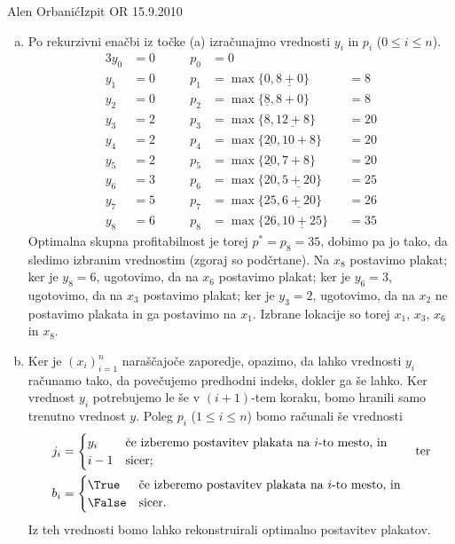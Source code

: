 \begin{naloga}{Alen Orbanić}{Izpit OR 15.9.2010}
\begin{odgovor}
\begin{enumerate}[(a)]
\item Po rekurzivni enačbi iz točke (a)
izračunajmo vrednosti $y_i$ in $p_i$ ($0 \le i \le n$).
\begin{alignat*}{3}
y_0 &= 0 &\qquad p_0 &= 0 \\
y_1 &= 0 &\qquad p_1 &= \max\{0, \underline{8 + 0}\}    &&= 8 \\
y_2 &= 0 &\qquad p_2 &= \max\{\underline{8}, 8 + 0\}    &&= 8 \\
y_3 &= 2 &\qquad p_3 &= \max\{8, \underline{12 + 8}\}   &&= 20 \\
y_4 &= 2 &\qquad p_4 &= \max\{\underline{20}, 10 + 8\}  &&= 20 \\
y_5 &= 2 &\qquad p_5 &= \max\{\underline{20}, 7 + 8\}   &&= 20 \\
y_6 &= 3 &\qquad p_6 &= \max\{20, \underline{5 + 20}\}  &&= 25 \\
y_7 &= 5 &\qquad p_7 &= \max\{25, \underline{6 + 20}\}  &&= 26 \\
y_8 &= 6 &\qquad p_8 &= \max\{26, \underline{10 + 25}\} &&= 35
\end{alignat*}
Optimalna skupna profitabilnost je torej $p^* = p_8 = 35$,
dobimo pa jo tako, da sledimo izbranim vrednostim (zgoraj so podčrtane).
Na $x_8$ postavimo plakat;
ker je $y_8 = 6$, ugotovimo, da na $x_6$ postavimo plakat;
ker je $y_6 = 3$, ugotovimo, da na $x_3$ postavimo plakat;
ker je $y_3 = 2$, ugotovimo,
da na $x_2$ ne postavimo plakata in ga postavimo na $x_1$.
Izbrane lokacije so torej $x_1$, $x_3$, $x_6$ in $x_8$.

\item Ker je $(x_i)_{i=1}^n$ naraščajoče zaporedje,
opazimo, da lahko vrednosti $y_i$ računamo tako,
da povečujemo predhodni indeks, dokler ga še lahko.
Ker vred\-nost $y_i$ potrebujemo le še v $(i+1)$-tem koraku,
bomo hranili samo trenutno vrednost $y$.
Poleg $p_i$ ($1 \le i \le n$) bomo računali še vrednosti
\begin{align*}
j_i &= \begin{cases}
y_i & \text{če izberemo postavitev plakata na $i$-to mesto, in} \\
i-1 & \text{sicer;}
\end{cases} \qquad \text{ter} \\
b_i &= \begin{cases}
\True & \text{če izberemo postavitev plakata na $i$-to mesto, in} \\
\False & \text{sicer.}
\end{cases}
\end{align*}
Iz teh vrednosti bomo lahko rekonstruirali optimalno postavitev plakatov.


\end{enumerate}
\end{odgovor}
\end{naloga}
